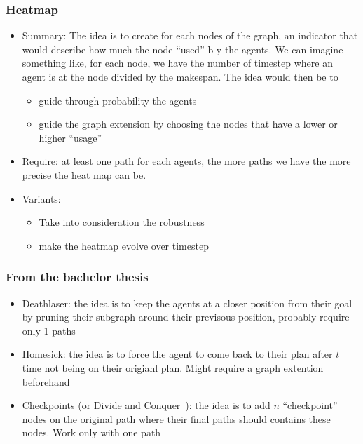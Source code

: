 \documentclass{article}
\theoremstyle{definition}
\begin{document}
\subsubsection{Heatmap}

\begin{itemize}
  \item Summary: The idea is to create for each nodes of the graph, an indicator that would describe how much the node ``used'' b y the agents. We can imagine something like, for each node, we have the number of timestep where an agent is at the node divided by the makespan. The idea would then be to \begin{itemize}
    \item guide through probability the agents
    \item guide the graph extension by choosing the nodes that have a lower or higher ``usage''
  \end{itemize}
  \item Require: at least one path for each agents, the more paths we have the more precise the heat map can be.
  \item Variants: \begin{itemize}
    \item Take into consideration the robustness~\cite{atstfewabazh20a,atstfestko20a}
    \item make the heatmap evolve over timestep
  \end{itemize} 
\end{itemize}

\subsubsection{From the bachelor thesis}
\begin{itemize}
  \item Deathlaser: the idea is to keep the agents at a closer position from their goal by pruning their subgraph around their previsous position, probably require only 1 paths
  \item Homesick: the idea is to force the agent to come back to their plan after $t$ time not being on their origianl plan. Might require a graph extention beforehand 
  \item Checkpoints (or Divide and Conquer~\cite{yulav16a}): the idea is to add $n$ ``checkpoint'' nodes on the original path where their final paths should contains these nodes. Work only with one path 
\end{itemize}
\end{document}
